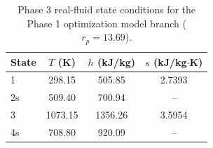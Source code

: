 \begin{table}[htbp]
    \centering
    \caption{Phase 3 real-fluid state conditions for the Phase 1 optimization model branch ($r_p = 13.69$).}
    \label{tab:phase3_state_conditions_phase1_optimization}
    \begin{tabular}{lccc}
        \hline
        State & $T$ (K) & $h$ (kJ/kg) & $s$ (kJ/kg$\cdot$K) \\
        \hline
        1 & 298.15 & 505.85 & 2.7393 \\
        2s & 509.40 & 700.94 & -- \\
        3 & 1073.15 & 1356.26 & 3.5954 \\
        4s & 708.80 & 920.09 & -- \\
        \hline
    \end{tabular}
\end{table}